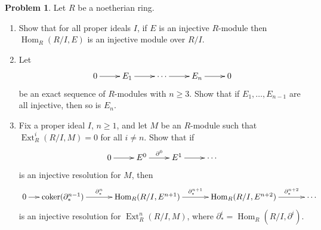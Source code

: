 \documentclass[11pt]{article}
\DeclareMathOperator{\Hom}{Hom}
\DeclareMathOperator{\coker}{coker}
\DeclareMathOperator{\Ext}{Ext}
\theoremstyle{definition}
\newtheorem{problem}{Problem}
\begin{document}
\begin{problem}
	Let $R$ be a noetherian ring.

\vspace{-0.5em}
\begin{enumerate}[label=\alph*), itemsep=-0.1em]
\item Show that for all proper ideals $I$, if $E$ is an injective $R$-module then $\Hom_R(R/I, E)$ is an injective module over $R/I$.
\item Let
\[ \xymatrix{
 0 \arrow[r] &	E_1 \arrow[r] & \cdots \arrow[r] & E_n \arrow[r] & 0
}\]
 be an exact sequence of $R$-modules with $n \geqslant 3$. Show that if $E_1, \ldots, E_{n-1}$ are all injective, then so is $E_n$.
\item Fix a proper ideal $I$, $n \geqslant 1$, and let $M$ be an $R$-module such that $\Ext^i_R(R/I,M) =0$ for all $i \neq n$.
Show that if
\[ \xymatrix{
 0 \arrow[r] &	E^0 \arrow[r]^-{\partial^0} & E^1 \arrow[r] & \cdots
}\]
is an injective resolution for $M$, then
\[ \xymatrix@C=1.3em{
 0 \arrow[r] & \coker (\partial^{n-1}_*) \arrow[rr]^-{\partial^n_*} && \Hom_R(R/I, E^{n+1}) \arrow[rr]^-{\partial^{n+1}_*} &&  \Hom_R(R/I, E^{n+2}) \arrow[rr]^-{\partial^{n+2}_*} && \cdots
}\]
is an injective resolution for $\Ext^n_R(R/I,M)$, where $\partial^i_* = \Hom_R(R/I, \partial^i)$.
\end{enumerate}
\end{problem}
\end{document}

